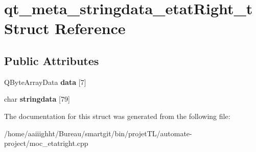 \hypertarget{structqt__meta__stringdata__etat_right__t}{\section{qt\-\_\-meta\-\_\-stringdata\-\_\-etat\-Right\-\_\-t Struct Reference}
\label{structqt__meta__stringdata__etat_right__t}
}
\subsection*{Public Attributes}
\begin{DoxyCompactItemize}
\item 
\hypertarget{structqt__meta__stringdata__etat_right__t_a23927212b2a8816af339c23e8667ee75}{Q\-Byte\-Array\-Data {\bfseries data} \mbox{[}7\mbox{]}}\label{structqt__meta__stringdata__etat_right__t_a23927212b2a8816af339c23e8667ee75}

\item 
\hypertarget{structqt__meta__stringdata__etat_right__t_a461a56b7dab2d4541ce1806226370f4e}{char {\bfseries stringdata} \mbox{[}79\mbox{]}}\label{structqt__meta__stringdata__etat_right__t_a461a56b7dab2d4541ce1806226370f4e}

\end{DoxyCompactItemize}


The documentation for this struct was generated from the following file\-:\begin{DoxyCompactItemize}
\item 
/home/aaiiighht/\-Bureau/smartgit/bin/projet\-T\-L/automate-\/project/moc\-\_\-etatright.\-cpp\end{DoxyCompactItemize}

